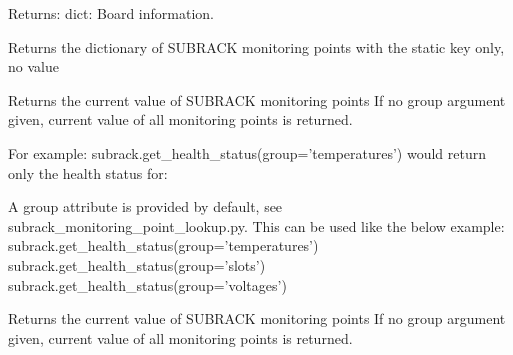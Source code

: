 \documentclass[letterpaper,10pt,english]{sphinxmanual}
\begin{document}
\begin{fulllineitems}
\begin{fulllineitems}
\sphinxAtStartPar
Returns:
dict: Board information.

\end{fulllineitems}


\begin{fulllineitems}
\label{\detokenize{apidocs:subrack_management_board.SubrackMngBoard.get_health_dict}}
\pysigstartsignatures
{}
\pysigstopsignatures
\sphinxAtStartPar
Returns the dictionary of SUBRACK monitoring points with the
static key only, no value

\end{fulllineitems}


\begin{fulllineitems}
\label{\detokenize{apidocs:subrack_management_board.SubrackMngBoard.get_health_status}}
\pysigstartsignatures
{}
\pysigstopsignatures
\sphinxAtStartPar
Returns the current value of SUBRACK monitoring points
If no group argument given, current value of all monitoring points is returned.

\sphinxAtStartPar
For example:
subrack.get\_health\_status(group=’temperatures’)
would return only the health status for:

\sphinxAtStartPar
A group attribute is provided by default, see subrack\_monitoring\_point\_lookup.py.
This can be used like the below example:
subrack.get\_health\_status(group=’temperatures’)
subrack.get\_health\_status(group=’slots’)
subrack.get\_health\_status(group=’voltages’)

\end{fulllineitems}


\begin{fulllineitems}
\label{\detokenize{apidocs:subrack_management_board.SubrackMngBoard.get_health_status_w_elapsed}}
\pysigstartsignatures
{}
\pysigstopsignatures
\sphinxAtStartPar
Returns the current value of SUBRACK monitoring points
If no group argument given, current value of all monitoring points is returned.


\end{fulllineitems}
\end{fulllineitems}
\end{document}
